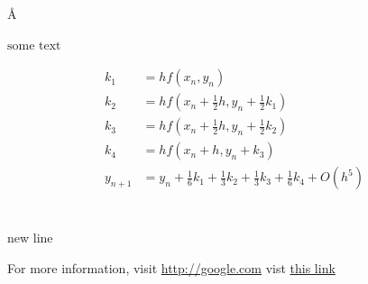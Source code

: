 \documentclass[12pt]{article}
\begin{document}
\AA{} %

$\textrm{some\ text}$ %


\begin{align*}
k_1 &= hf(x_n,y_n)\\
k_2 &= hf(x_n+\frac{1}{2}h,y_n+\frac{1}{2}k_1)\\
k_3 &= hf(x_n+\frac{1}{2}h,y_n+\frac{1}{2}k_2)\\
k_4 &= hf(x_n+h,y_n+k_3)\\
y_{n+1} &=
y_n+\frac{1}{6}k_1+\frac{1}{3}k_2+\frac{1}{3}k_3+\frac{1}{6}k_4+O(h^5)\\
\end{align*}


\\ new line
\hspace %
\hspace{20 mm} %
\vspace %
\newpage  %
\noindent %


For more information, visit \textcolor{blue}{\url{http://google.com}}
vist \textcolor{blue}{\href{http://google.com}{this link}}

%
%

% 
% 
\end{document}
